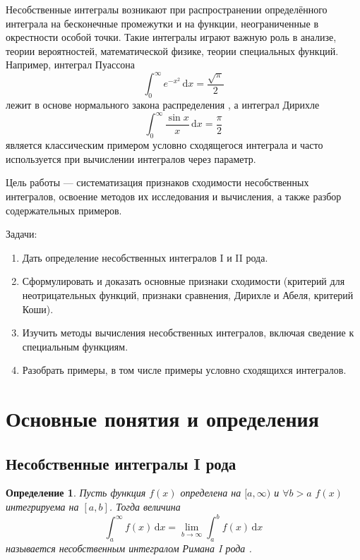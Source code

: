 \documentclass[coursework, och, times]{SCWorks1}
\newtheorem{definition}{Определение}
\newcommand{\dd}{\,\mathrm{d}}
\begin{document}



\intro
Несобственные интегралы возникают при распространении определённого интеграла на бесконечные промежутки и на функции, неограниченные в окрестности особой точки. Такие интегралы играют важную роль в анализе, теории вероятностей, математической физике, теории специальных функций. Например, интеграл Пуассона
\[
\int_0^\infty e^{-x^2}\dd x=\frac{\sqrt{\pi}}{2}
\]
лежит в основе нормального закона распределения \cite{fikht}, а интеграл Дирихле
\[
\int_0^\infty \frac{\sin x}{x}\dd x=\frac{\pi}{2}
\]
является классическим примером условно сходящегося интеграла и часто используется при вычислении интегралов через параметр.

Цель работы — систематизация признаков сходимости несобственных интегралов, освоение методов их исследования и вычисления, а также разбор содержательных примеров.
 
Задачи:
\begin{enumerate}[label=\arabic*.]
\item Дать определение несобственных интегралов I и II рода.
\item Сформулировать и доказать основные признаки сходимости (критерий для неотрицательных функций, признаки сравнения, Дирихле и Абеля, критерий Коши).
\item Изучить методы вычисления несобственных интегралов, включая сведение к специальным функциям.
\item Разобрать примеры, в том числе примеры условно сходящихся интегралов.
\end{enumerate}


\section{Основные понятия и определения}

\subsection{Несобственные интегралы I рода}
\begin{definition}
Пусть функция $f(x)$ определена на $[a,\infty)$ и $\forall b>a$ $f(x)$ интегрируема на $[a,b]$. Тогда величина
\[
\int_a^\infty f(x)\dd x = \lim_{b \to \infty}\int_a^b f(x)\dd x
\]
называется несобственным интегралом Римана I рода \cite{fikht,zorich1}.    
\end{definition}
\end{document}
